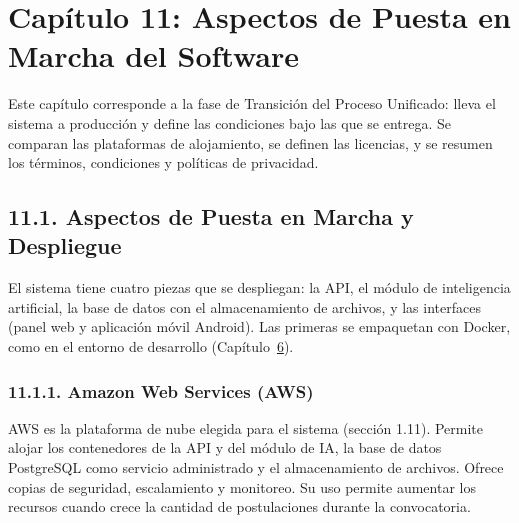 
\newpage
\section{Capítulo 11: Aspectos de Puesta en Marcha del Software}\label{cap:puesta_marcha}


Este capítulo corresponde a la fase de Transición del Proceso Unificado: lleva el sistema a producción y define las condiciones bajo las que se entrega. Se comparan las plataformas de alojamiento, se definen las licencias, y se resumen los términos, condiciones y políticas de privacidad.

\subsection{11.1. Aspectos de Puesta en Marcha y Despliegue}

El sistema tiene cuatro piezas que se despliegan: la API, el módulo de inteligencia artificial, la base de datos con el almacenamiento de archivos, y las interfaces (panel web y aplicación móvil Android). Las primeras se empaquetan con Docker, como en el entorno de desarrollo (Capítulo~\hyperref[cap:infraestructura]{6}).

\subsubsection{11.1.1. Amazon Web Services (AWS)}

AWS es la plataforma de nube elegida para el sistema (sección 1.11). Permite alojar los contenedores de la API y del módulo de IA, la base de datos PostgreSQL como servicio administrado y el almacenamiento de archivos. Ofrece copias de seguridad, escalamiento y monitoreo. Su uso permite aumentar los recursos cuando crece la cantidad de postulaciones durante la convocatoria.

